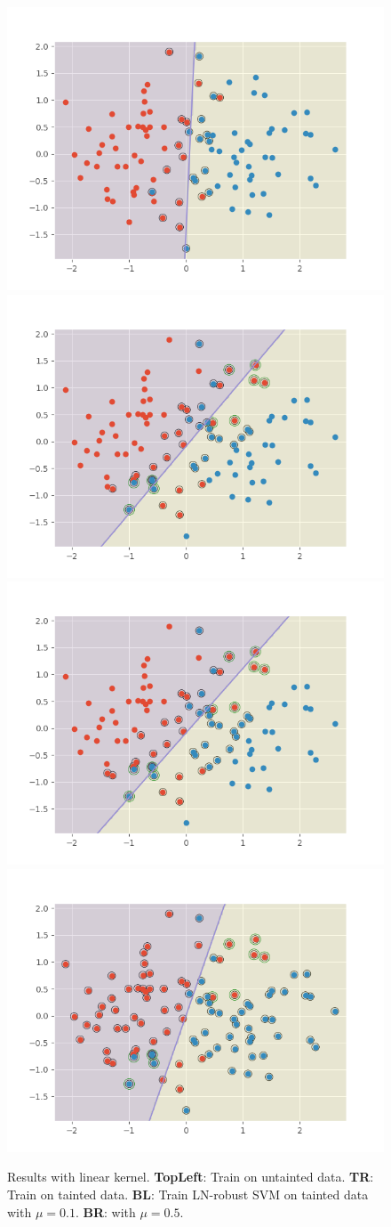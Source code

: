 \documentclass[12pt]{article}
\begin{document}
\begin{itemize}
    \begin{figure}
        \centering 
        \includegraphics[width=.45\textwidth]{./fig/linear/ori.png} 
        \includegraphics[width=.45\textwidth]{./fig/linear/ln.png} \\
        \includegraphics[width=.45\textwidth]{./fig/linear/ln.robust.mu.0.1.png} 
        \includegraphics[width=.45\textwidth]{./fig/linear/ln.robust.mu.0.5.png} 
        \caption{ Results with linear kernel. \textbf{TopLeft}: Train on untainted data. \textbf{TR}: Train on tainted data.
        \textbf{BL}: Train LN-robust SVM on tainted data with $\mu  = 0.1$. \textbf{BR}: with $\mu = 0.5$.}
        \label{fig:linear}
    \end{figure}


\end{itemize}
\end{document}
